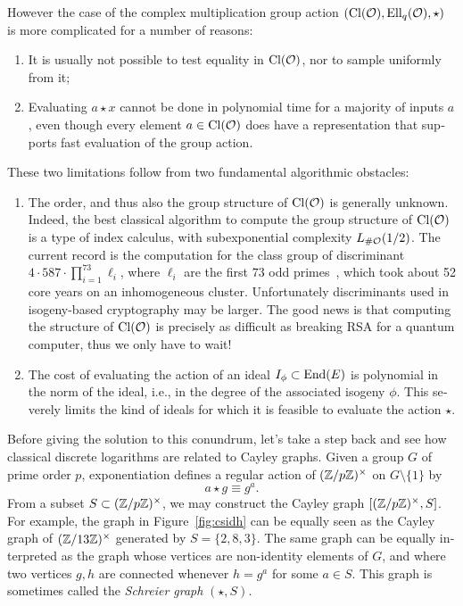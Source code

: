 \begin{otherlanguage}{english}
  However the case of the complex multiplication group action
  $(\mathrm{Cl}(\mathcal{O}), \mathrm{Ell}_q(\mathcal{O}), \star)$ is more complicated for a number of
  reasons:
  \begin{enumerate}
  \item It is usually not possible to test equality in $\mathrm{Cl}(\mathcal{O})$, nor
    to sample uniformly from it;
  \item Evaluating $a\star x$ cannot be done in polynomial time for a
    majority of inputs $a$, even though every element $a\in\mathrm{Cl}(\mathcal{O})$
    does have a representation that supports fast evaluation of the
    group action.
  \end{enumerate}
  These two limitations follow from two fundamental algorithmic
  obstacles:
  \begin{enumerate}
  \item The order, and thus also the group structure of $\mathrm{Cl}(\mathcal{O})$ is
    generally unknown. Indeed, the best classical algorithm to compute
    the group structure of $\mathrm{Cl}(\mathcal{O})$ is a type of index calculus, with
    subexponential complexity $L_{\#\mathcal{O}}(1/2)$. The current record is
    the computation for the class group of discriminant
    $4\cdot 587\cdot\prod_{i=1}^{73} \ell_i$, where $\ell_i$ are the
    first $73$ odd primes~\cite{10.1007/978-3-030-34578-5_9}, which
    took about 52 core years on an inhomogeneous
    cluster. Unfortunately discriminants used in isogeny-based
    cryptography may be larger. The good news is that computing the
    structure of $\mathrm{Cl}(\mathcal{O})$ is precisely as difficult as breaking RSA
    for a quantum computer, thus we only have to wait!
  \item The cost of evaluating the action of an ideal
    $I_\phi\subset\mathrm{End}(E)$ is polynomial in the norm of the ideal,
    i.e., in the degree of the associated isogeny $\phi$. This
    severely limits the kind of ideals for which it is feasible to
    evaluate the action $\star$.
  \end{enumerate}

  Before giving the solution to this conundrum, let's take a step back
  and see how classical discrete logarithms are related to Cayley
  graphs. Given a group $G$ of prime order $p$, exponentiation defines
  a regular action of $(\mathbb{Z}/p\mathbb{Z})^\times$ on $G\setminus\{1\}$ by
  \[a\star g \equiv g^a.\] %
  From a subset $S\subset(\mathbb{Z}/p\mathbb{Z})^\times$, we may construct the Cayley
  graph $[(\mathbb{Z}/p\mathbb{Z})^\times,S]$. For example, the graph in
  Figure~\ref{fig:csidh} can be equally seen as the Cayley graph of
  $(\mathbb{Z}/13\mathbb{Z})^\times$ generated by $S=\{2,8,3\}$. The same graph can be
  equally interpreted as the graph whose vertices are non-identity
  elements of $G$, and where two vertices $g,h$ are connected whenever
  $h=g^a$ for some $a\in S$. This graph is sometimes called the
  \emph{Schreier graph} $(\star,S)$.


\end{otherlanguage}
